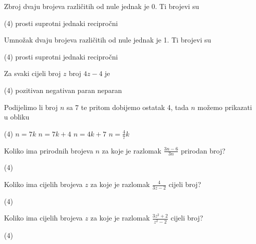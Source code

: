 \begin{zadatak}
	Zbroj dvaju brojeva različitih od nule jednak je 0.
	Ti brojevi su
    \begin{tasks}(4)
		\task prosti
		\task suprotni
		\task jednaki
		\task recipročni
	\end{tasks}
\end{zadatak}

\begin{zadatak}
	Umnožak dvaju brojeva različitih od nule jednak je 1.
	Ti brojevi su
    \begin{tasks}(4)
		\task prosti
		\task suprotni
		\task jednaki
		\task recipročni
	\end{tasks}
\end{zadatak}

\begin{zadatak}
	Za svaki cijeli broj $z$ broj $4z - 4$ je
    \begin{tasks}(4)
		\task pozitivan
		\task negativan
		\task paran
		\task neparan
	\end{tasks}
\end{zadatak}

\begin{zadatak}
	Podijelimo li broj $n$ sa 7 te pritom dobijemo ostatak 4, tada $n$ možemo prikazati u obliku
    \begin{tasks}(4)
		\task $n=7k$
		\task $n=7k+4$
		\task $n=4k+7$
		\task $n=\displaystyle \frac{4}{7}k$
	\end{tasks}
\end{zadatak}

\begin{zadatak}
	Koliko ima prirodnih brojeva $n$ za koje je razlomak $\displaystyle \frac{3n-6}{3n}$ prirodan broj?
    \begin{tasks}(4)
	\end{tasks}
\end{zadatak}

\pagebreak

\begin{zadatak}
	Koliko ima cijelih brojeva $z$ za koje je razlomak $\displaystyle \frac{4}{3z-2}$ cijeli broj?
    \begin{tasks}(4)
	\end{tasks}
\end{zadatak}

\begin{zadatak}
	Koliko ima cijelih brojeva $z$ za koje je razlomak $\displaystyle \frac{3z^2+2}{z^2-2}$ cijeli broj?
    \begin{tasks}(4)
	\end{tasks}
\end{zadatak}


